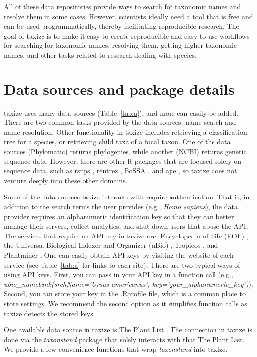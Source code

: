 \documentclass[10pt]{article}\usepackage[]{graphicx}\usepackage[]{color}
\begin{document}
All of these data repositories provide ways to search for taxonomic names and resolve them in some cases. However, scientists ideally need a tool that is free and can be used programmatically,  thereby facilitating reproducible research. The goal of taxize is to make it easy to create reproducible and easy to use workflows for searching for taxonomic names, resolving them, getting higher taxonomic names, and other tasks related to research dealing with species.
 

\section*{Data sources and package details}
taxize uses many data sources (Table~\ref{tab:a}), and more can easily be added. There are two common tasks provided by the data sources: name search and name resolution. Other functionality in taxize includes retrieving a classification tree for a species, or retrieving child taxa of a focal taxon. One of the data sources (Phylomatic) returns phylogenies, while another (NCBI) returns genetic sequence data. However, there are other R packages that are focused solely on sequence data, such as rsnps \cite{chamberlain2013}, rentrez \cite{winter2013}, BoSSA \cite{lefeuvre2010}, and ape \cite{paradis2004}, so taxize does not venture deeply into these other domains. 

Some of the data sources taxize interacts with require authentication. That is, in addition to the search terms the user provides (e.g., \emph{Homo sapiens}), the data provider requires an alphanumeric identification key so that they can better manage their servers, collect analytics, and shut down users that abuse the API. The services that require an API key in taxize are: Encyclopedia of Life (EOL) \cite{eol}, the Universal Biological Indexer and Organizer (uBio) \cite{ubio}, Tropicos \cite{tropicos}, and Plantminer \cite{carvalho2010plantminer}. One can easily obtain API keys by visiting the website of each service (see Table~\ref{tab:a} for links to each site). There are two typical ways of using API keys. First, you can pass in your API key in a function call (e.g., \emph{ubio\_namebank(srchName='Ursus americanus', key='your\_alphanumeric\_key')}). Second, you can store your key in the .Rprofile file, which is a common place to store settings. We recommend the second option as it simplifies function calls as taxize detects the stored keys.

One available data source in taxize is The Plant List \cite{theplantlist}. The connection in taxize is done via the \emph{taxonstand} package \cite{Cayuela_2012} that solely interacts with that The Plant List. We provide a few convenience functions that wrap \emph{taxonstand} into taxize.
\end{document}
